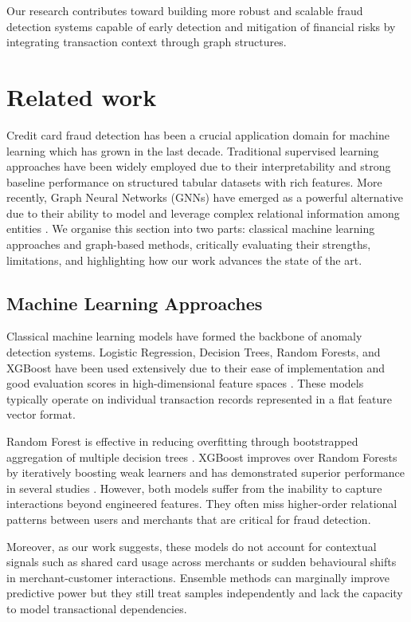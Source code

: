 \documentclass[conference]{IEEEtran}
\begin{document}
Our research contributes toward building more robust and scalable fraud detection systems capable of early detection and mitigation of financial risks by integrating transaction context through graph structures.


\section{Related work}

Credit card fraud detection has been a crucial application domain for machine learning which has grown in the last decade. Traditional supervised learning approaches have been widely employed due to their interpretability and strong baseline performance on structured tabular datasets \cite{awoyemi2017comparative,xuan2018random} with rich features. More recently, Graph Neural Networks (GNNs) have emerged as a powerful alternative due to their ability to model and leverage complex relational information among entities \cite{cheng2025gnnreview}. We organise this section into two parts: classical machine learning approaches and graph-based methods, critically evaluating their strengths, limitations, and highlighting how our work advances the state of the art.

\subsection{Machine Learning Approaches}

Classical machine learning models have formed the backbone of anomaly detection systems. Logistic Regression, Decision Trees, Random Forests, and XGBoost have been used extensively due to their ease of implementation and good evaluation scores in high-dimensional feature spaces \cite{chaudhary2012review,ieee1297040}. These models typically operate on individual transaction records represented in a flat feature vector format.

Random Forest is effective in reducing overfitting through bootstrapped aggregation of multiple decision trees \cite{xuan2018random}. XGBoost improves over Random Forests by iteratively boosting weak learners and has demonstrated superior performance in several studies \cite{IEEE9719580}. However, both models suffer from the inability to capture interactions beyond engineered features. They often miss higher-order relational patterns between users and merchants that are critical for fraud detection.

Moreover, as our work suggests, these models do not account for contextual signals such as shared card usage across merchants or sudden behavioural shifts in merchant-customer interactions. Ensemble methods can marginally improve predictive power but they still treat samples independently and lack the capacity to model transactional dependencies.
\end{document}
